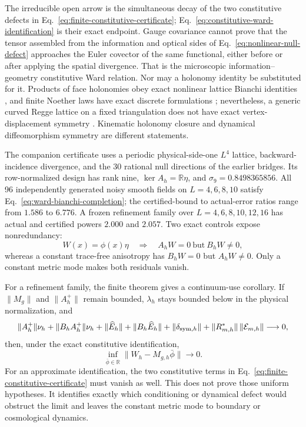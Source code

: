 The irreducible open arrow is the simultaneous decay of the two
constitutive defects in Eq.~\eqref{eq:finite-constitutive-certificate};
Eq.~\eqref{eq:constitutive-ward-identification} is their exact endpoint.
Gauge covariance cannot prove that the tensor assembled from the information
and optical sides of Eq.~\eqref{eq:nonlinear-null-defect} approaches the Euler
covector of the same functional, either before or after applying the spatial
divergence.  That is the microscopic information--geometry constitutive Ward
relation.  Nor may a holonomy identity be substituted for it.  Products of
face holonomies obey exact nonlinear lattice Bianchi identities
\cite{Batrouni1982,HamberKagel2004}, and finite Noether laws have exact
discrete formulations \cite{Skopenkov2023,Arrighi2023}; nevertheless, a
generic curved Regge lattice on a fixed triangulation does not have exact
vertex-displacement symmetry \cite{BahrDittrich2009}.  Kinematic holonomy
closure and dynamical diffeomorphism symmetry are different statements.

The companion certificate uses a periodic physical-side-one \(L^4\)
lattice, backward-incidence divergence, and the 30 rational null directions
of the earlier bridges.  Its row-normalized design has rank nine,
\(\ker A_h=\mathbb R\eta\), and
\(\sigma_9=0.8498365856\).  All 96 independently generated noisy smooth
fields on \(L=4,6,8,10\) satisfy
Eq.~\eqref{eq:ward-bianchi-completion}; the certified-bound to
actual-error ratios range from \(1.586\) to \(6.776\).  A frozen refinement
family over
\(L=4,6,8,10,12,16\) has actual and certified powers \(2.000\) and \(2.057\).
Two exact controls expose nonredundancy:
\[
 W(x)=\phi(x)\eta
 \quad\Longrightarrow\quad
 A_hW=0\ \text{but}\ B_hW\ne0,
\]
whereas a constant trace-free anisotropy has
\(B_hW=0\) but \(A_hW\ne0\).  Only a constant metric mode makes both
residuals vanish.

For a refinement family, the finite theorem gives a continuum-use
corollary.  If \(\|M_g\|\) and \(\|A_h^+\|\) remain bounded,
\(\lambda_h\) stays bounded below in the physical normalization, and
\[
\|A_h^+\|\nu_h+\|B_hA_h^+\|\nu_h
+\|\widehat E_h\|+\|B_h\widehat E_h\|
+\|\delta_{{\rm sym},h}\|
+\|R_{m,h}^*\|\,\|\mathcal E_{m,h}\|
\longrightarrow0 ,
\]
then, under the exact constitutive identification,
\[
 \inf_{\bar\phi\in\mathbb R}\|W_h-M_{g,h}\bar\phi\|\longrightarrow0.
\]
For an approximate identification, the two constitutive terms in
Eq.~\eqref{eq:finite-constitutive-certificate} must vanish as well.
This does not prove those uniform hypotheses.  It identifies exactly which
conditioning or dynamical defect would obstruct the limit and leaves the
constant metric mode to boundary or cosmological dynamics.

